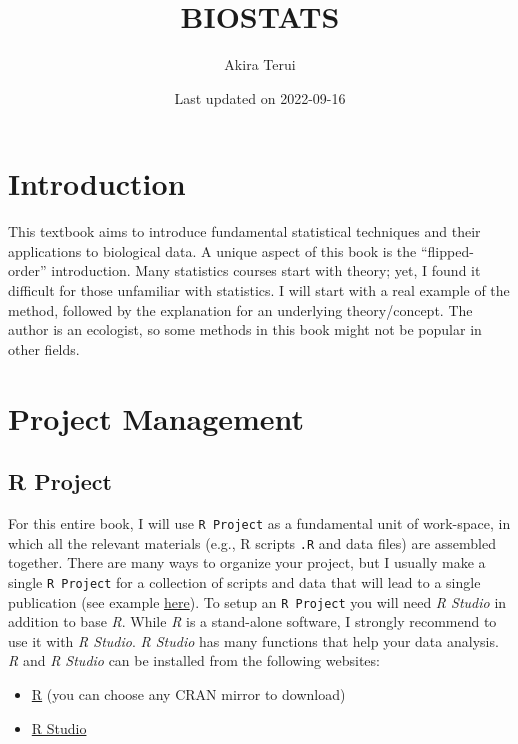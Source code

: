 \documentclass[
]{book}
\title{BIOSTATS}
\author{Akira Terui}
\date{Last updated on 2022-09-16}
\providecommand{\tightlist}{%
  \setlength{\itemsep}{0pt}\setlength{\parskip}{0pt}}
\begin{document}
\maketitle

{
\setcounter{tocdepth}{1}
\tableofcontents
}
\hypertarget{introduction}{%
\chapter*{Introduction}\label{introduction}}

This textbook aims to introduce fundamental statistical techniques and their applications to biological data. A unique aspect of this book is the ``flipped-order'' introduction. Many statistics courses start with theory; yet, I found it difficult for those unfamiliar with statistics. I will start with a real example of the method, followed by the explanation for an underlying theory/concept. The author is an ecologist, so some methods in this book might not be popular in other fields.

\hypertarget{project-management}{%
\chapter{Project Management}\label{project-management}}

\hypertarget{r-project}{%
\section{R Project}\label{r-project}}

For this entire book, I will use \texttt{R\ Project} as a fundamental unit of work-space, in which all the relevant materials (e.g., R scripts \texttt{.R} and data files) are assembled together. There are many ways to organize your project, but I usually make a single \texttt{R\ Project} for a collection of scripts and data that will lead to a single publication (see example \href{https://github.com/aterui/public-proj_stream-diversity}{here}). To setup an \texttt{R\ Project} you will need \emph{R Studio} in addition to base \emph{R}. While \emph{R} is a stand-alone software, I strongly recommend to use it with \emph{R Studio}. \emph{R Studio} has many functions that help your data analysis. \emph{R} and \emph{R Studio} can be installed from the following websites:

\begin{itemize}
\tightlist
\item
  \href{https://www.r-project.org/}{R} (you can choose any CRAN mirror to download)
\item
  \href{https://rStudio.com/products/rStudio/download/}{R Studio}
\end{itemize}
\end{document}
